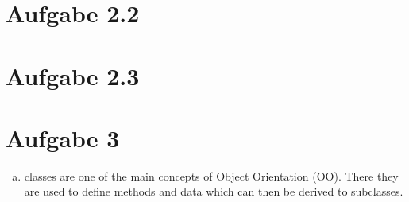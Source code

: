 \documentclass[a4paper,10pt]{scrartcl}[2003/01/01]
\begin{document}
	
	\section*{Aufgabe 2.2}
	
	\section*{Aufgabe 2.3}
	
	\section{Aufgabe 3}
	\begin{enumerate}[a)]
		\item classes are one of the main concepts of Object Orientation (OO). There they are used to define methods and data which can then be derived to subclasses.
		
	\end{enumerate}
\end{document}
